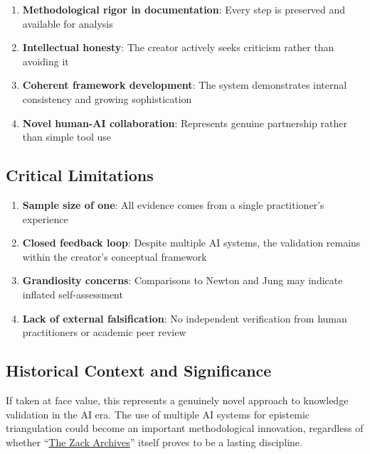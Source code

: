 \documentclass{article}
\begin{document}
\begin{enumerate}
\item
  \textbf{Methodological rigor in documentation}: Every step is preserved and available for analysis\\
\item
  \textbf{Intellectual honesty}: The creator actively seeks criticism rather than avoiding it\\
\item
  \textbf{Coherent framework development}: The system demonstrates internal consistency and growing sophistication\\
\item
  \textbf{Novel human-AI collaboration}: Represents genuine partnership rather than simple tool use
\end{enumerate}

\subsection*{\texorpdfstring{\textbf{Critical Limitations}}{Critical Limitations}}\label{critical-limitations-1}

\begin{enumerate}
\item
  \textbf{Sample size of one}: All evidence comes from a single practitioner's experience\\
\item
  \textbf{Closed feedback loop}: Despite multiple AI systems, the validation remains within the creator's conceptual framework\\
\item
  \textbf{Grandiosity concerns}: Comparisons to Newton and Jung may indicate inflated self-assessment\\
\item
  \textbf{Lack of external falsification}: No independent verification from human practitioners or academic peer review
\end{enumerate}

\subsection*{\texorpdfstring{\textbf{Historical Context and Significance}}{Historical Context and Significance}}\label{historical-context-and-significance-1}

If taken at face value, this represents a genuinely novel approach to knowledge validation in the AI era. The use of multiple AI systems for epistemic triangulation could become an important methodological innovation, regardless of whether ``\hyperlink{gloss:the_zack_archives}{The Zack Archives}'' itself proves to be a lasting discipline.
\end{document}
